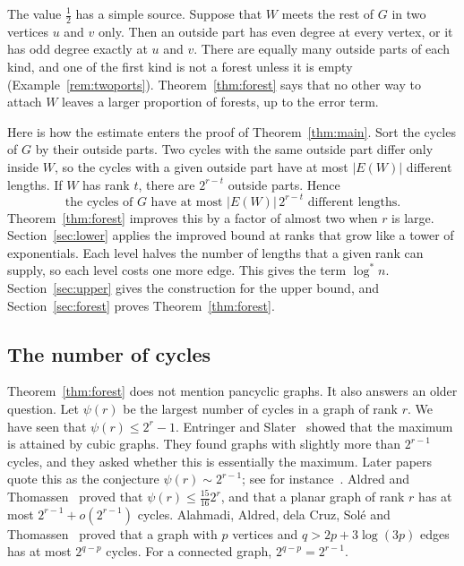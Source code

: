 \documentclass[11pt]{article}
\theoremstyle{definition}
\theoremstyle{remark}
\newcommand{\lgs}{\log^{*}}
\newcommand{\half}{\tfrac12}
\numberwithin{equation}{section}
\begin{document}
The value $\half$ has a simple source. Suppose that $W$ meets the rest of $G$ in two vertices $u$
and $v$ only. Then an outside part has even degree at every vertex, or it has odd degree exactly at
$u$ and $v$. There are equally many outside parts of each kind, and one of the first kind is not a
forest unless it is empty (Example~\ref{rem:twoports}). Theorem~\ref{thm:forest} says that no other
way to attach $W$ leaves a larger proportion of forests, up to the error term.

Here is how the estimate enters the proof of Theorem~\ref{thm:main}. Sort the cycles of $G$ by their
outside parts. Two cycles with the same outside part differ only inside $W$, so the cycles with a
given outside part have at most $|E(W)|$ different lengths. If $W$ has rank $t$, there are $2^{r-t}$
outside parts. Hence
\begin{equation}\label{eq:trivial}
  \text{the cycles of $G$ have at most }|E(W)|\,2^{r-t}\text{ different lengths.}
\end{equation}
Theorem~\ref{thm:forest} improves this by a factor of almost two when $r$ is large.
Section~\ref{sec:lower} applies the improved bound at ranks that grow like a tower of exponentials. Each level halves the number of
lengths that a given rank can supply, so each level costs one more edge. This gives the term
$\lgs n$. Section~\ref{sec:upper} gives the construction for the upper bound, and
Section~\ref{sec:forest} proves Theorem~\ref{thm:forest}.

\subsection{The number of cycles}

Theorem~\ref{thm:forest} does not mention pancyclic graphs. It also answers an older question. Let
$\psi(r)$ be the largest number of cycles in a graph of rank $r$. We have seen that
$\psi(r)\le2^{r}-1$. Entringer and Slater~\cite{ES} showed that the maximum is attained by cubic
graphs. They found graphs with slightly more than $2^{r-1}$ cycles, and they asked whether this is
essentially the maximum. Later papers quote this as the conjecture $\psi(r)\sim2^{r-1}$; see for
instance~\cite{HK}. Aldred and Thomassen~\cite{AT} proved that $\psi(r)\le\frac{15}{16}2^{r}$, and
that a planar graph of rank $r$ has at most $2^{r-1}+o(2^{r-1})$ cycles. Alahmadi, Aldred, dela
Cruz, Sol\'e and Thomassen~\cite{AACST} proved that a graph with $p$ vertices and
$q>2p+3\log(3p)$ edges has at most $2^{q-p}$ cycles. For a connected graph, $2^{q-p}=2^{r-1}$.
\end{document}
